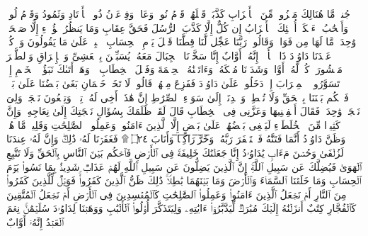 \stopbuffer
\startbuffer[\q:38:11]
جُندࣱ مَّا هُنَالِكَ مَهۡزُومࣱ مِّنَ ٱلۡأَحۡزَابِ%
\stopbuffer
\startbuffer[\q:38:12]
كَذَّبَتۡ قَبۡلَهُمۡ قَوۡمُ نُوحࣲ وَعَادࣱ وَفِرۡعَوۡنُ ذُو ٱلۡأَوۡتَادِ%
\stopbuffer
\startbuffer[\q:38:13]
وَثَمُودُ وَقَوۡمُ لُوطࣲ وَأَصۡحَٰبُ لۡءَیۡكَةِۚ أُو۟لَٰۤئِكَ ٱلۡأَحۡزَابُ%
\stopbuffer
\startbuffer[\q:38:14]
إِن كُلٌّ إِلَّا كَذَّبَ ٱلرُّسُلَ فَحَقَّ عِقَابِ%
\stopbuffer
\startbuffer[\q:38:15]
وَمَا یَنظُرُ هَٰۤؤُلَاۤءِ إِلَّا صَیۡحَةࣰ وَٰحِدَةࣰ مَّا لَهَا مِن فَوَاقࣲ%
\stopbuffer
\startbuffer[\q:38:16]
وَقَالُوا۟ رَبَّنَا عَجِّل لَّنَا قِطَّنَا قَبۡلَ یَوۡمِ ٱلۡحِسَابِ%
\stopbuffer
\startbuffer[\q:38:17]
ٱصۡبِرۡ عَلَىٰ مَا یَقُولُونَ وَٱذۡكُرۡ عَبۡدَنَا دَاوُۥدَ ذَا ٱلۡأَیۡدِۖ إِنَّهُۥۤ أَوَّابٌ%
\stopbuffer
\startbuffer[\q:38:18]
إِنَّا سَخَّرۡنَا ٱلۡجِبَالَ مَعَهُۥ یُسَبِّحۡنَ بِٱلۡعَشِیِّ وَٱلۡإِشۡرَاقِ%
\stopbuffer
\startbuffer[\q:38:19]
وَٱلطَّیۡرَ مَحۡشُورَةࣰۖ كُلࣱّ لَّهُۥۤ أَوَّابࣱ%
\stopbuffer
\startbuffer[\q:38:20]
وَشَدَدۡنَا مُلۡكَهُۥ وَءَاتَیۡنَٰهُ ٱلۡحِكۡمَةَ وَفَصۡلَ ٱلۡخِطَابِ%
\stopbuffer
\startbuffer[\q:38:21]
۞ وَهَلۡ أَتَىٰكَ نَبَؤُا۟ ٱلۡخَصۡمِ إِذۡ تَسَوَّرُوا۟ ٱلۡمِحۡرَابَ%
\stopbuffer
\startbuffer[\q:38:22]
إِذۡ دَخَلُوا۟ عَلَىٰ دَاوُۥدَ فَفَزِعَ مِنۡهُمۡۖ قَالُوا۟ لَا تَخَفۡۖ خَصۡمَانِ بَغَىٰ بَعۡضُنَا عَلَىٰ بَعۡضࣲ فَٱحۡكُم بَیۡنَنَا بِٱلۡحَقِّ وَلَا تُشۡطِطۡ وَٱهۡدِنَاۤ إِلَىٰ سَوَاۤءِ ٱلصِّرَٰطِ%
\stopbuffer
\startbuffer[\q:38:23]
إِنَّ هَٰذَاۤ أَخِی لَهُۥ تِسۡعࣱ وَتِسۡعُونَ نَعۡجَةࣰ وَلِیَ نَعۡجَةࣱ وَٰحِدَةࣱ فَقَالَ أَكۡفِلۡنِیهَا وَعَزَّنِی فِی ٱلۡخِطَابِ%
\stopbuffer
\startbuffer[\q:38:24]
قَالَ لَقَدۡ ظَلَمَكَ بِسُؤَالِ نَعۡجَتِكَ إِلَىٰ نِعَاجِهِۦۖ وَإِنَّ كَثِیرࣰا مِّنَ ٱلۡخُلَطَاۤءِ لَیَبۡغِی بَعۡضُهُمۡ عَلَىٰ بَعۡضٍ إِلَّا ٱلَّذِینَ ءَامَنُوا۟ وَعَمِلُوا۟ ٱلصَّٰلِحَٰتِ وَقَلِیلࣱ مَّا هُمۡۗ وَظَنَّ دَاوُۥدُ أَنَّمَا فَتَنَّٰهُ فَٱسۡتَغۡفَرَ رَبَّهُۥ وَ̅خَ̅رَّ̅ ̅رَ̅ا̅كِ̅عࣰ̅ا̅ وَأَنَابَ ۝٢٤ ۩%
\stopbuffer
\startbuffer[\q:38:25]
فَغَفَرۡنَا لَهُۥ ذَٰلِكَۖ وَإِنَّ لَهُۥ عِندَنَا لَزُلۡفَىٰ وَحُسۡنَ مَءَابࣲ%
\stopbuffer
\startbuffer[\q:38:26]
یَٰدَاوُۥدُ إِنَّا جَعَلۡنَٰكَ خَلِیفَةࣰ فِی ٱلۡأَرۡضِ فَٱحۡكُم بَیۡنَ ٱلنَّاسِ بِٱلۡحَقِّ وَلَا تَتَّبِعِ ٱلۡهَوَىٰ فَیُضِلَّكَ عَن سَبِیلِ ٱللَّهِۚ إِنَّ ٱلَّذِینَ یَضِلُّونَ عَن سَبِیلِ ٱللَّهِ لَهُمۡ عَذَابࣱ شَدِیدُۢ بِمَا نَسُوا۟ یَوۡمَ ٱلۡحِسَابِ%
\stopbuffer
\startbuffer[\q:38:27]
وَمَا خَلَقۡنَا ٱلسَّمَاۤءَ وَٱلۡأَرۡضَ وَمَا بَیۡنَهُمَا بَٰطِلࣰاۚ ذَٰلِكَ ظَنُّ ٱلَّذِینَ كَفَرُوا۟ۚ فَوَیۡلࣱ لِّلَّذِینَ كَفَرُوا۟ مِنَ ٱلنَّارِ%
\stopbuffer
\startbuffer[\q:38:28]
أَمۡ نَجۡعَلُ ٱلَّذِینَ ءَامَنُوا۟ وَعَمِلُوا۟ ٱلصَّٰلِحَٰتِ كَٱلۡمُفۡسِدِینَ فِی ٱلۡأَرۡضِ أَمۡ نَجۡعَلُ ٱلۡمُتَّقِینَ كَٱلۡفُجَّارِ%
\stopbuffer
\startbuffer[\q:38:29]
كِتَٰبٌ أَنزَلۡنَٰهُ إِلَیۡكَ مُبَٰرَكࣱ لِّیَدَّبَّرُوۤا۟ ءَایَٰتِهِۦ وَلِیَتَذَكَّرَ أُو۟لُوا۟ ٱلۡأَلۡبَٰبِ%
\stopbuffer
\startbuffer[\q:38:30]
وَوَهَبۡنَا لِدَاوُۥدَ سُلَیۡمَٰنَۚ نِعۡمَ ٱلۡعَبۡدُ إِنَّهُۥۤ أَوَّابٌ%
\stopbuffer
